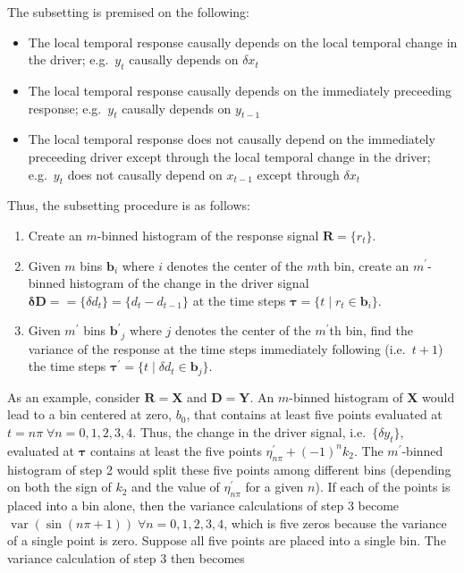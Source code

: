 \documentclass[a4paper,11pt]{article}
\begin{document}
The subsetting is premised on the following:
\begin{itemize}
\item The local temporal response causally depends on the local temporal change in the driver; e.g.\ $y_{t}$ causally depends on $\delta x_{t}$
\item The local temporal response causally depends on the immediately preceeding response; e.g.\ $y_{t}$ causally depends on $y_{t-1}$
\item The local temporal response does not causally depend on the immediately preceeding driver except through the local temporal change in the driver; e.g.\ $y_{t}$ does not causally depend on $x_{t-1}$ except through $\delta x_t$
\end{itemize}
Thus, the subsetting procedure is as follows:
\begin{enumerate}
\item Create an $m$-binned histogram of the response signal $\mathbf{R} = \{r_t\}$.
\item Given $m$ bins $\mathbf{b}_i$ where $i$ denotes the center of the $m$th bin, create an $m^\prime$-binned histogram of the change in the driver signal $\mathbf{\delta D} = =\{\delta d_t\} = \{d_t-d_{t-1}\}$ at the time steps $\mathbf{\tau} = \{t\;|\;r_t\in \mathbf{b}_i\}$.
\item Given $m^\prime$ bins $\mathbf{b^\prime}_j$ where $j$ denotes the center of the $m^\prime$th bin, find the variance of the response at the time steps immediately following (i.e.\ $t+1$) the time steps $\mathbf{\tau^\prime} = \{t\;|\;\delta d_t\in \mathbf{b}_j\}$.
\end{enumerate}
As an example, consider $\mathbf{R} = \mathbf{X}$ and $\mathbf{D} = \mathbf{Y}$.  An $m$-binned histogram of $\mathbf{X}$ would lead to a bin centered at zero, $b_0$, that contains at least five points evaluated at $t=n\pi\;\forall n=0,1,2,3,4$.  Thus, the change in the driver signal, i.e.\ $\{\delta y_t\}$, evaluated at $\mathbf{\tau}$ contains at least the five points $\eta^\prime_{n\pi} + \left(-1\right)^n k_2$.  The $m^\prime$-binned histogram of step 2 would split these five points among different bins (depending on both the sign of $k_2$ and the value of $\eta^\prime_{n\pi}$ for a given $n$).  If each of the points is placed into a bin alone, then the variance calculations of step 3 become $\mathop{var}\left(\sin(n\pi+1)\right)\;\forall n=0,1,2,3,4$, which is five zeros because the variance of a single point is zero.  Suppose all five points are placed into a single bin.  The variance calculation of step 3 then becomes 
\end{document}
